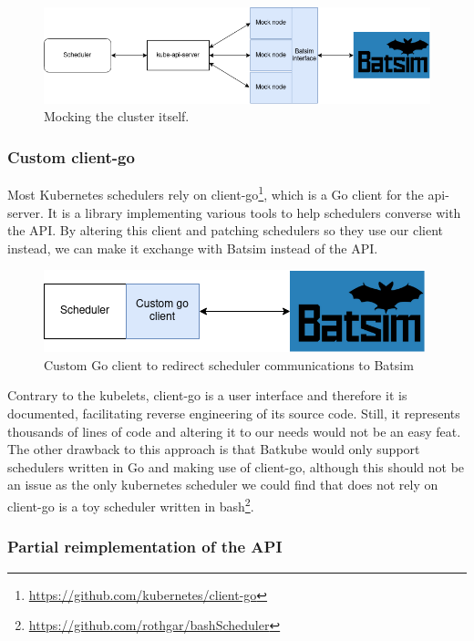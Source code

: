 \begin{figure}[h]
	\centering
	\includegraphics[width=\textwidth]{imgs/architecture-as-kubelets.png}
	\caption{Mocking the cluster itself.}
	\label{fig:mock_nodes}
\end{figure}

\subsubsection{Custom client-go}

Most Kubernetes schedulers rely on
client-go\footnote{\url{https://github.com/kubernetes/client-go}}, which is a Go
client for the api-server. It is a library implementing various tools to help
schedulers converse with the API. By altering this client and patching
schedulers so they use our client instead, we can make it exchange with Batsim
instead of the API. 

\begin{figure}[h]
	\centering
	\includegraphics[scale=0.8]{imgs/custom-go-client.png}
	\caption{Custom Go client to redirect scheduler communications to Batsim}
	\label{fig:custom-go-client}
\end{figure}

Contrary to the kubelets, client-go is a user interface and therefore it is
documented, facilitating reverse engineering of its source code. Still, it
represents thousands of lines of code and altering it to our needs would not be
an easy feat.  The other drawback to this approach is that Batkube would only
support schedulers written in Go and making use of client-go, although this
should not be an issue as the only kubernetes scheduler we could find that does
not rely on client-go is a toy scheduler written in
bash\footnote{\url{https://github.com/rothgar/bashScheduler}}.

\subsubsection{Partial reimplementation of the API}

